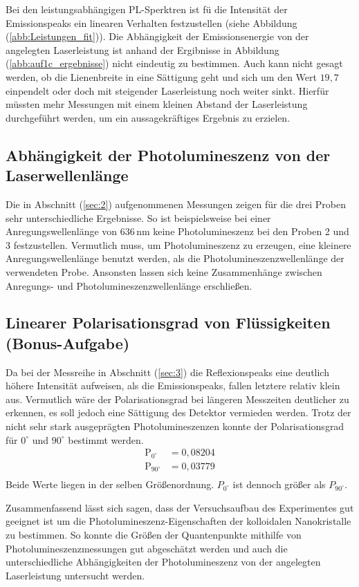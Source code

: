 \bigskip 
Bei den leistungsabh\"{a}ngigen PL-Sperktren ist f\"{u} die Intensit\"{a}t der Emissionspeaks ein linearen Verhalten festzustellen (siehe Abbildung (\ref{abb:Leistungen_fit})).
Die Abh\"{a}ngigkeit der Emissions{\-}ener{\-}gie von der angelegten Laserleistung ist anhand der Ergibnisse in Abbildung (\ref{abb:auf1c_ergebnisse}) nicht eindeutig zu bestimmen.
Auch kann nicht gesagt werden, ob die Lienenbreite in eine S\"{a}ttigung geht und sich um den Wert $19,7$ einpendelt oder doch mit steigender Laserleistung noch weiter sinkt.
Hierf\"{u}r m\"{u}ssten mehr Messungen mit einem kleinen Abstand der Laserleistung durchgef\"{u}hrt werden, um ein aussagekr\"{a}ftiges Ergebnis zu erzielen.

\subsection{Abhängigkeit der Photolumineszenz von der Laserwellenlänge}
Die in Abschnitt (\ref{sec:2}) aufgenommenen Messungen zeigen f\"{u}r die drei Proben sehr unterschiedliche Ergebnisse.
So ist beispielsweise bei einer Anregungswellenl\"{a}nge von $636 \, \text{nm}$ keine Photolumineszenz bei den Proben 2 und 3 festzustellen.
Vermutlich muss, um Photolumineszenz zu erzeugen, eine kleinere Anregungswellenl\"{a}nge benutzt werden, als die Photolumineszenzwellenl\"{a}nge der verwendeten Probe.
Ansonsten lassen sich keine Zusammenh\"{a}nge zwischen Anregungs- und Photolumineszenzwellenl\"{a}nge erschlie{\ss}en.

\subsection{Linearer Polarisationsgrad von Flüssigkeiten (Bonus-Aufgabe)}
Da bei der Messreihe in Abschnitt (\ref{sec:3}) die Reflexionspeaks eine deutlich h\"{o}here Intensit\"{a}t aufweisen, als die Emissionspeaks, fallen letztere relativ klein aus.
Vermutlich w\"{a}re der Polarisationsgrad bei l\"{a}ngeren Messzeiten deutlicher zu erkennen, es soll jedoch eine S\"{a}ttigung des Detektor vermieden werden.
Trotz der nicht sehr stark ausgepr\"{a}gten Photolumineszenzen konnte der Polarisationsgrad f\"{u}r $0^{\circ}$ und $90^{\circ}$ bestimmt werden.
\begin{align*}
	\text{P}_{0^{\circ}} &= 0,08204 \\
	\text{P}_{90^{\circ}} &= 0,03779 \\	
\end{align*}
Beide Werte liegen in der selben Gr\"{o}{\ss}enordnung.
${P}_{0^{\circ}}$ ist dennoch gr\"{o}{\ss}er als ${P}_{90^{\circ}}$.

\bigskip
Zusammenfassend l\"{a}sst sich sagen, dass der Versuchsaufbau des Experimentes gut geeignet ist um die Photolumineszenz-Eigenschaften der kolloidalen Nanokristalle zu bestimmen.
So konnte die Gr\"{o}{\ss}en der Quantenpunkte mithilfe von Photolumineszenz{\-}mess{\-}un{\-}gen gut abgesch\"{a}tzt werden und auch die unterschiedliche Abhängigkeiten der Photo{\-}lumines{\-}zenz von der angelegten Laserleistung untersucht werden.

